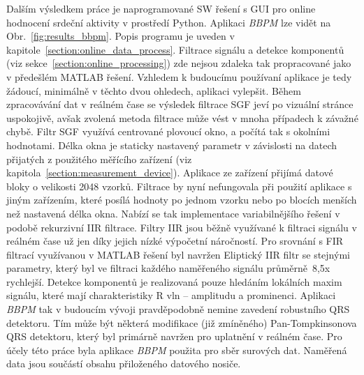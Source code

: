 Dalším výsledkem práce je naprogramované SW řešení s GUI pro online hodnocení
srdeční aktivity v prostředí Python. Aplikaci \textit{BBPM} lze vidět
na Obr.~\ref{fig:results_bbpm}. Popis programu je uveden v
kapitole~\ref{section:online_data_process}. Filtrace signálu a detekce
komponentů (viz sekce~\ref{section:online_processing}) zde nejsou zdaleka tak
propracované jako v předešlém MATLAB řešení. Vzhledem k budoucímu
používaní aplikace je tedy žádoucí, minimálně v těchto dvou ohledech, aplikaci
vylepšit. Během zpracovávání dat v reálném čase se výsledek filtrace SGF jeví po
vizuální stránce uspokojivě, avšak zvolená metoda filtrace může vést v mnoha
případech k závažné chybě. Filtr SGF využívá centrované plovoucí okno, a počítá
tak s okolními hodnotami. Délka okna je staticky nastavený parametr v závislosti
na datech přijatých z použitého měřícího zařízení (viz
kapitola~\ref{section:measurement_device}). Aplikace ze zařízení přijímá datové
bloky o velikosti 2048 vzorků. Filtrace by nyní nefungovala při použití aplikace
s jiným zařízením, které posílá hodnoty po jednom vzorku nebo po blocích menších
než nastavená délka okna. Nabízí se tak implementace variabilnějšího řešení v
podobě rekurzivní IIR filtrace. Filtry IIR jsou běžně využívané k filtraci
signálu v reálném čase už jen díky jejich nízké výpočetní náročností. Pro
srovnání s FIR filtrací využívanou v MATLAB řešení byl navržen
Eliptický IIR filtr se stejnými parametry, který byl ve filtraci každého
naměřeného signálu průměrně~8,5x rychlejší. Detekce komponentů je realizovaná
pouze hledáním lokálních maxim signálu, které mají charakteristiky R vln --
amplitudu a prominenci. Aplikaci \textit{BBPM} tak v budoucím vývoji
pravděpodobně nemine zavedení robustního QRS detektoru. Tím může být některá
modifikace (již zmíněného) Pan-Tompkinsonova QRS detektoru, který byl primárně
navržen pro uplatnění v reálném čase. Pro účely této práce byla aplikace
\textit{BBPM} použita pro sběr surových dat. Naměřená data jsou součástí obsahu
přiloženého datového nosiče.

